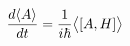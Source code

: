 \documentclass[preview]{standalone}
\begin{document}
\begin{align*}
\special{dvisvgm:raw <g id='unique000'>}\dv{\langle A\rangle}{t}=\frac{1}{i\hbar}\big\langle[A,H]\big\rangle\special{dvisvgm:raw </g>}
\end{align*}
\end{document}
